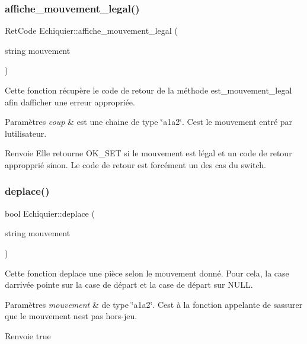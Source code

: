 \subsubsection{\texorpdfstring{affiche\+\_\+mouvement\+\_\+legal()}{affiche\_mouvement\_legal()}}
{\footnotesize\ttfamily Ret\+Code Echiquier\+::affiche\+\_\+mouvement\+\_\+legal (\begin{DoxyParamCaption}\item[{string}]{mouvement }\end{DoxyParamCaption})}

Cette fonction récupère le code de retour de la méthode est\+\_\+mouvement\+\_\+legal afin d\textquotesingle{}afficher une erreur appropriée.


\begin{DoxyParams}{Paramètres}
{\em coup} & est une chaine de type \char`\"{}a1a2\char`\"{}. C\textquotesingle{}est le mouvement entré par l\textquotesingle{}utilisateur. \\
\hline
\end{DoxyParams}
\begin{DoxyReturn}{Renvoie}
Elle retourne O\+K\+\_\+\+S\+ET si le mouvement est légal et un code de retour appropprié sinon. Le code de retour est forcément un des cas du switch. 
\end{DoxyReturn}
\mbox{\label{classEchiquier_a2ea383ab5acef9fb01881f8fd6b84055}} 
\subsubsection{\texorpdfstring{deplace()}{deplace()}}
{\footnotesize\ttfamily bool Echiquier\+::deplace (\begin{DoxyParamCaption}\item[{string}]{mouvement }\end{DoxyParamCaption})}



Cette fonction deplace une pièce selon le mouvement donné. Pour cela, la case d\textquotesingle{}arrivée pointe sur la case de départ et la case de départ sur N\+U\+LL. 


\begin{DoxyParams}{Paramètres}
{\em mouvement} & de type \char`\"{}a1a2\char`\"{}. C\textquotesingle{}est à la fonction appelante de s\textquotesingle{}assurer que le mouvement n\textquotesingle{}est pas hors-\/jeu.\\
\hline
\end{DoxyParams}
\begin{DoxyReturn}{Renvoie}
true 
\end{DoxyReturn}
\mbox{\label{classEchiquier_ad453eba7d2462c3ded58ce755d38e673}} 
